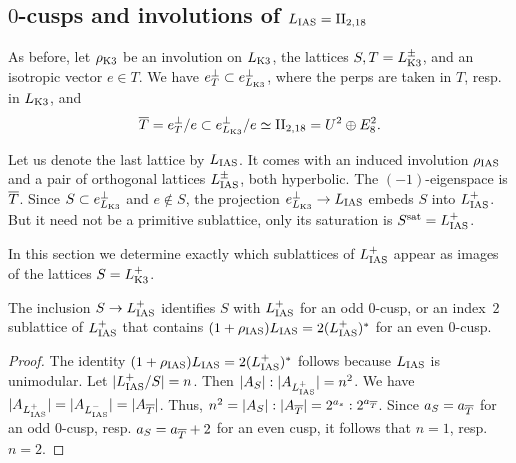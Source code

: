 \documentclass{amsart}
\begin{document}
\subsection{$0$-cusps and involutions of $L_{\rm IAS} = {\rm II}_{2,18}$}
\label{sec:reverse-moves}

As before, let $\rho_{\rm K3}$ be an involution on $L_{\rm K3}$, the lattices
$S,T=L_{\rm K3}^{\pm}$, and an isotropic vector $e\in T$. We have
$e^\perp_T\subset e^\perp_{L_{\rm K3}}$, where the perps are taken in
$T$, resp. in $L_{\rm K3}$, and
$${\overline T} = e^\perp_T/e \subset e^\perp_{L_{\rm K3}}/e \simeq {\rm II}_{2,18} =
U^2\oplus E_8^2.$$

Let us denote the last lattice by $L_{\rm IAS}$. It comes with an induced
involution $\rho_{\rm IAS}$ and a pair of orthogonal lattices $L_{\rm IAS}^{\pm}$,
both hyperbolic. The $(-1)$-eigenspace is ${\overline T}$. Since
$S\subset e^\perp_{L_{\rm K3}}$ and $e\notin S$, the projection
$e^\perp_{L_{\rm K3}} \to L_{\rm IAS}$ embeds $S$ into $L_{\rm IAS}^+$. But it need not
be a primitive sublattice, only its saturation is $S^{\rm sat}= L_{\rm IAS}^+$.

In this section we determine exactly which sublattices of $L_{\rm IAS}^+$
appear as images of the lattices $S = L_{\rm K3}^+$. 


\begin{lemma} \label{lem:invo-lias-forward}
  The inclusion $S\to L_{\rm IAS}^+$ identifies $S$ with $L_{\rm IAS}^+$ for
  an odd $0$-cusp, or an index~$2$ sublattice of $L_{\rm IAS}^+$ that
  contains $(1 + \rho_{\rm IAS})L_{\rm IAS} = 2(L_{\rm IAS}^+)^*$ for an even $0$-cusp.

\end{lemma}
\begin{proof}
  The
  identity $(1+\rho_{\rm IAS})L_{\rm IAS} = 2(L_{\rm IAS}^+)^*$ follows because $L_{\rm IAS}$
  is unimodular.
  Let $|L_{\rm IAS}^+/S|=n$. Then $|A_S| : |A_{L_{\rm IAS}^+}| = n^2$. We have
  $|A_{L_{\rm IAS}^+}| = |A_{L_{\rm IAS}^-}| = |A_{\overline T}|$. Thus,
  $n^2 = |A_S| : |A_{\overline T}| = 2^{a_s} : 2^{a_{\overline T}}$.  Since $a_S = a_{\overline T}$
  for an odd $0$-cusp, resp. $a_S = a_{\overline T}+2$ for an even cusp,
  it follows that $n=1$, resp. $n=2$.
\end{proof}
\end{document}
